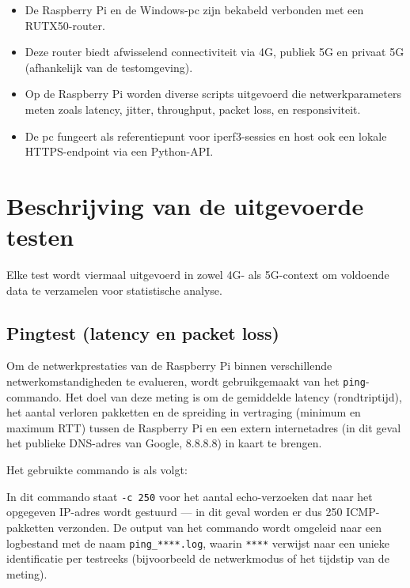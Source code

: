 \begin{itemize}
    \item De Raspberry Pi en de Windows-pc zijn bekabeld verbonden met een RUTX50-router.
    \item Deze router biedt afwisselend connectiviteit via 4G, publiek 5G en privaat 5G (afhankelijk van de testomgeving).
    \item Op de Raspberry Pi worden diverse scripts uitgevoerd die netwerkparameters meten zoals latency, jitter, throughput, packet loss, en responsiviteit.
    \item De pc fungeert als referentiepunt voor iperf3-sessies en host ook een lokale HTTPS-endpoint via een Python-API.
\end{itemize}

\section{Beschrijving van de uitgevoerde testen}

Elke test wordt viermaal uitgevoerd in zowel 4G- als 5G-context om voldoende data te verzamelen voor statistische analyse.

\subsection{Pingtest (latency en packet loss)}
Om de netwerkprestaties van de Raspberry Pi binnen verschillende netwerkomstandigheden te evalueren, wordt gebruikgemaakt van het \texttt{ping}-commando. Het doel van deze meting is om de gemiddelde latency (rondtriptijd), het aantal verloren pakketten en de spreiding in vertraging (minimum en maximum RTT) tussen de Raspberry Pi en een extern internetadres (in dit geval het publieke DNS-adres van Google, 8.8.8.8) in kaart te brengen.

Het gebruikte commando is als volgt: 


In dit commando staat \texttt{-c 250} voor het aantal echo-verzoeken dat naar het opgegeven IP-adres wordt gestuurd — in dit geval worden er dus 250 ICMP-pakketten verzonden. De output van het commando wordt omgeleid naar een logbestand met de naam \texttt{ping\_****.log}, waarin \texttt{****} verwijst naar een unieke identificatie per testreeks (bijvoorbeeld de netwerkmodus of het tijdstip van de meting).

